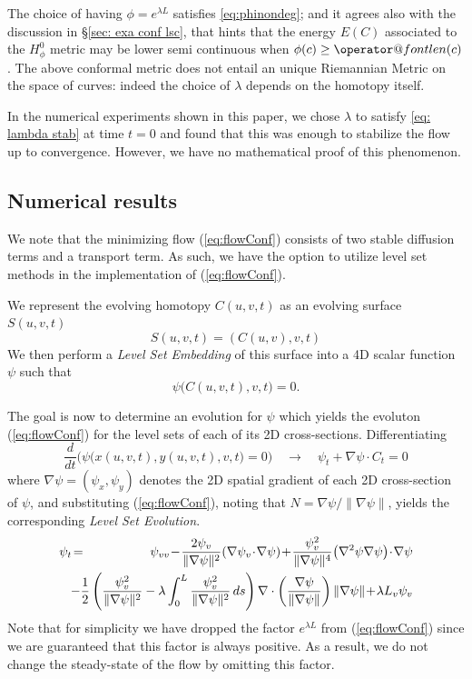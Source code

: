 \documentclass[twoside,a4paper,english]{article}
\makeatletter
\def\len{\mathop{\operator@font len}\nolimits}
\makeatother
\begin{document}
The choice of having $\phi=e^{\lambda L}$ 
satisfies \eqref{eq:phinondeg}; and it agrees
also with the discussion in \S\ref{sec: exa conf lsc}, 
that hints that the energy $E(C)$ associated to the $H^0_\phi$ metric
may be lower semi continuous when 
$\phi(c)\ge \len(c)$.
The above conformal metric does not entail an unique Riemannian Metric 
on the space of curves: indeed the choice of $\lambda$ depends on
the homotopy itself.

In the numerical experiments shown in this paper, we chose $\lambda$ 
to satisfy \eqref{eq: lambda stab} at time $t=0$ and found that
this was enough to stabilize the flow up to convergence. However,
we have no mathematical proof of this phenomenon.

\subsection{Numerical results}
\label{sec: numerical}
We note that the minimizing flow (\ref{eq:flowConf}) consists of
two stable diffusion terms and a transport term. As such, we have
the option to utilize level set methods in the implementation of
(\ref{eq:flowConf}).



We represent the evolving homotopy $C(u,v,t)$ as an evolving surface
$S(u,v,t)$
  $$S(u,v,t)=(C(u,v),v,t)$$
We then perform a {\em Level Set Embedding} of this surface into a 4D scalar
function $\psi$ such that
  $$\psi\big(C(u,v,t),v,t\big)=0.$$

The goal is now to determine an evolution for $\psi$ which yields
the evoluton (\ref{eq:flowConf}) for the level sets of each of
its 2D cross-sections. Differentiating
$$
  \frac{d}{dt}\Big(\psi\big(x(u,v,t),y(u,v,t),v,t\big)=0\Big)
  \quad\longrightarrow\quad
  \psi_t+\nabla\psi\cdot C_t=0
$$
where $\nabla\psi=(\psi_x,\psi_y)$ denotes the 2D spatial gradient of each
2D cross-section of $\psi$, and substituting (\ref{eq:flowConf}),
noting that $N=\nabla\psi/\|\nabla\psi\|$, yields the corresponding
{\em Level Set Evolution}.
  \begin{eqnarray*}
  \psi_t\!=&& \hspace{-7mm}
     \psi_{vv}
    \!-\!\frac{2\psi_v}{\|\nabla\psi\|^2}(\nabla\psi_v\!\cdot\!\nabla\psi)
    \!+\!\frac{\psi_v^2}{\|\nabla\psi\|^4}
    \big(\nabla^2\psi\nabla\psi\big)\!\cdot\!\nabla\psi
  \\ && \hspace{-7mm} \nonumber
    -\frac{1}{2}\left(
      \frac{\psi_v^2}{\|\nabla\psi\|^2}
     -\lambda\int_0^L\frac{\psi_v^2}{\|\nabla\psi\|^2}\,ds
    \right)
    \nabla\cdot\left(\frac{\nabla\psi}{\|\nabla\psi\|}\right)\|\nabla\psi\|
   \!+\!\lambda L_v\psi_v
  \end{eqnarray*}
Note that for simplicity we have dropped the factor
$e^{\lambda L}$ from (\ref{eq:flowConf}) since we are guaranteed
that this factor is always positive. As a result, we do not change
the steady-state of the flow by omitting this factor.
\end{document}
